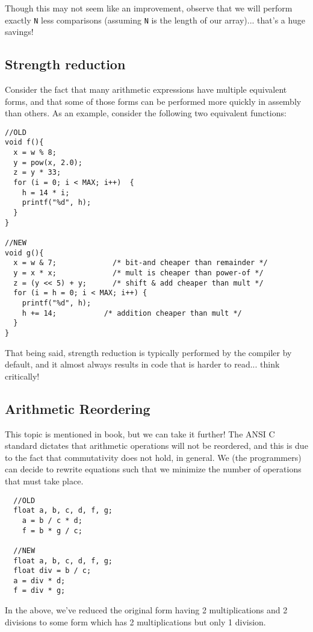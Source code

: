 \documentclass[10pt]{article}
\renewcommand{\#}{\raisebox{.22ex}{\large\old}}
\begin{document}
\noindent Though this may not seem like an improvement, observe that we will perform exactly \texttt{N} less comparisons (assuming \texttt{N} is the length of our array)... that's a huge savings!


\newpage

\subsection{Strength reduction}
Consider the fact that many arithmetic expressions have multiple equivalent forms, and that some of those forms can be performed more quickly in assembly than others. As an example, consider the following two equivalent functions:

\begin{lstlisting}
//OLD
void f(){
  x = w % 8;
  y = pow(x, 2.0);
  z = y * 33;
  for (i = 0; i < MAX; i++)  {
    h = 14 * i; 
    printf("%d", h);
  }
}

//NEW
void g(){
  x = w & 7;             /* bit-and cheaper than remainder */  
  y = x * x;             /* mult is cheaper than power-of */
  z = (y << 5) + y;      /* shift & add cheaper than mult */
  for (i = h = 0; i < MAX; i++) {
    printf("%d", h);
    h += 14;           /* addition cheaper than mult */
  }
}
\end{lstlisting}

\noindent That being said, strength reduction is typically performed by the compiler by default, and it almost always results in code that is harder to read... think critically!

\subsection{Arithmetic Reordering}
This topic is mentioned in book, but we can take it further! The ANSI C standard dictates that arithmetic operations will not be reordered, and this is due to the fact that commutativity does not hold, in general. We (the programmers) can decide to rewrite equations such that we minimize the number of operations that must take place.


\begin{lstlisting}
  //OLD
  float a, b, c, d, f, g;  
    a = b / c * d;  
    f = b * g / c;

  //NEW
  float a, b, c, d, f, g;  
  float div = b / c;
  a = div * d;
  f = div * g;
\end{lstlisting}

In the above, we've reduced the original form having 2 multiplications and 2 divisions to some form which has 2 multiplications but only 1 division.
\end{document}
